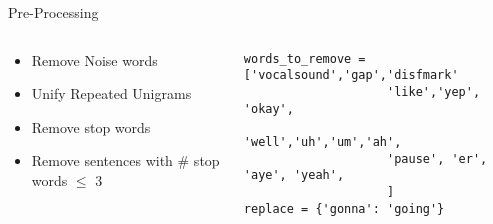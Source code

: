 \begin{frame}[fragile]{Pre-Processing}
\begin{columns}  %
\begin{column}{0.3\textwidth}
        \begin{itemize}
            \item Remove Noise words
            \item Unify Repeated Unigrams
            \item Remove stop words
            \item Remove sentences with \# stop words $\leq$ 3
    \end{itemize}
    \end{column}
    \begin{column}{0.7\textwidth}
        \begin{block}{}
            \begin{verbatim}
words_to_remove = ['vocalsound','gap','disfmark'
                    'like','yep', 'okay',
                    'well','uh','um','ah',
                    'pause', 'er', 'aye', 'yeah', 
                    ]
replace = {'gonna': 'going'}
            \end{verbatim}
        \end{block}
    \end{column}
\end{columns}
\end{frame}



